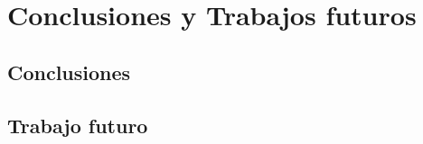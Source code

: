 \chapter{Conclusiones y Trabajos futuros}
\label{ch:conclusiones}

\section{Conclusiones}

\section{Trabajo futuro}
